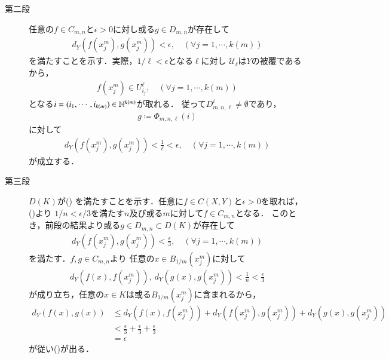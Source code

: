 \begin{prf}
\begin{description}
			\item[第二段]
				任意の$f \in C_{m,n}$と$\epsilon > 0$に対し或る$g \in D_{m,n}$が存在して
				\begin{align}
					d_Y\left(f(x^m_j),g(x^m_j)\right) < \epsilon,
					\quad (\forall j=1,\cdots,k(m))
				\end{align}
				を満たすことを示す．実際，$1/\ell < \epsilon$となる$\ell$に対し
				$\mathscr{U}_\ell$は$Y$の被覆であるから，
				\begin{align}
					f(x^m_j) \in U^\ell_{i_j},
					\quad (\forall j=1,\cdots,k(m))
				\end{align}
				となる$i=(i_1,\cdots,i_{k(m)}) \in \mathbb{N}^{k(m)}$が取れる．
				従って$D^i_{m,n,\ell} \neq \emptyset$であり，
				\begin{align}
					g \coloneqq \Phi_{m,n,\ell}(i)
				\end{align}
				に対して
				\begin{align}
					d_Y\left(f(x^m_j),g(x^m_j)\right) < \frac{1}{\ell} < \epsilon,
					\quad (\forall j=1,\cdots,k(m))
				\end{align}
				が成立する．
				
			\item[第三段]
				$D(K)$が()
				を満たすことを示す．任意に$f \in C(X,Y)$と$\epsilon > 0$を取れば，
				()より
				$1/n < \epsilon/3$を満たす$n$及び或る$m$に対して$f \in C_{m,n}$となる．
				このとき，前段の結果より或る$g \in D_{m,n} \subset D(K)$が存在して
				\begin{align}
					d_Y\left(f(x^m_j),g(x^m_j)\right) < \frac{\epsilon}{3},
					\quad (\forall j=1,\cdots,k(m))
				\end{align}
				を満たす．$f,g \in C_{m,n}$より
				任意の$x \in B_{1/m}(x^m_j)$に対して
				\begin{align}
					d_Y\left(f(x),f(x^m_j)\right),\ d_Y\left(g(x),g(x^m_j)\right) < \frac{1}{n} < \frac{\epsilon}{3}
				\end{align}
				が成り立ち，任意の$x \in K$は或る$B_{1/m}(x^m_j)$に含まれるから，
				\begin{align}
					d_Y\left(f(x),g(x)\right)
					&\leq d_Y\left(f(x),f(x^m_j)\right) + d_Y\left(f(x^m_j),g(x^m_j)\right) + d_Y\left(g(x),g(x^m_j)\right) \\
					&< \frac{\epsilon}{3}+\frac{\epsilon}{3}+\frac{\epsilon}{3} \\
					&= \epsilon
				\end{align}
				が従い()が出る．
				

\end{description}
\end{prf}
